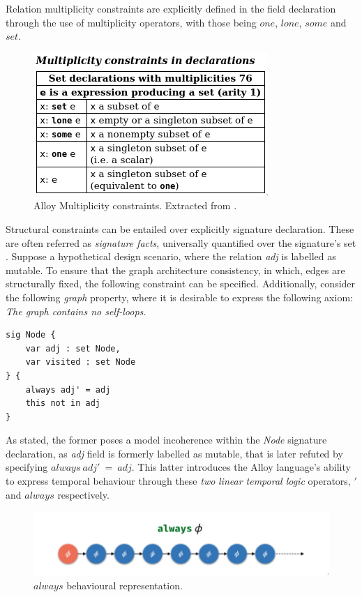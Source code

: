 Relation multiplicity constraints are explicitly defined in the field declaration through the use of multiplicity operators, with those being $one$, $lone$, $some$ and $set$.

\begin{figure}[H]
    \centering
    \includegraphics[width=0.4\linewidth]{img/alloy_multiplicity.png}
    \caption{Alloy Multiplicity constraints. Extracted from \cite{alloy-qr}.} 
    \label{fig:alloy-multiplicity}
\end{figure}


Structural constraints can be entailed over explicitly signature declaration. These are often referred as \textit{signature facts}, universally quantified over the signature's set \cite{alloy-qr}. Suppose a hypothetical design scenario, where the relation \textit{adj} is labelled as mutable. To ensure that the graph architecture consistency, in which, edges are structurally fixed, the following constraint can be specified. Additionally, consider the following \textit{graph} property, where it is desirable to express the following axiom: \textit{The graph contains no self-loops.}

\begin{lstlisting}[title={\textit{Node} hypothetical constraints over the signature definition.}, otherkeywords = {abstract, sig, module, var, set, fact, extends, no, in, this, not, always, \', \=}, floatplacement=H]
sig Node {
    var adj : set Node, 
    var visited : set Node
} {
    always adj' = adj
    this not in adj
}
\end{lstlisting}

As stated, the former poses a model incoherence within the \textit{Node} signature declaration, as \textit{adj} field is formerly labelled as mutable, that is later refuted by specifying $always \ adj'\ =\ adj$. This latter introduces the Alloy language's ability to express temporal behaviour through these \textit{two} \textit{linear temporal logic} operators, $'$ and $always$ respectively. 

\begin{figure}[H]
    \centering
    \includegraphics[width=0.7\linewidth]{img/alloy_always.png}
    \caption{$always$ behavioural representation.}
    \label{fig:alloy-always}
\end{figure}


